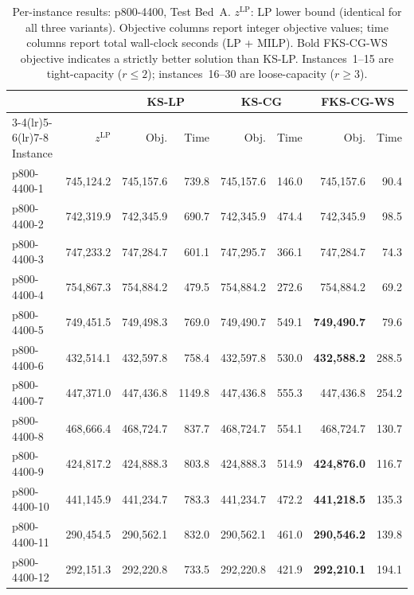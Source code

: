 \begin{table}[htbp]
\centering
\caption{Per-instance results: p800-4400, Test Bed~A.
         $z^{\mathrm{LP}}$: LP lower bound (identical for all three variants).
         Objective columns report integer objective values;
         time columns report total wall-clock seconds (LP + MILP).
         Bold FKS-CG-WS objective indicates a strictly better solution than KS-LP.
         Instances~1--15 are tight-capacity ($r \leq 2$);
         instances~16--30 are loose-capacity ($r \geq 3$).}
\label{tab:app_tba_800_4400}
\footnotesize
\setlength{\tabcolsep}{3pt}
\begin{tabular}{lrrrrrrr}
\toprule
 & & \multicolumn{2}{c}{KS-LP} & \multicolumn{2}{c}{KS-CG} & \multicolumn{2}{c}{FKS-CG-WS} \\
\cmidrule(lr){3-4}\cmidrule(lr){5-6}\cmidrule(lr){7-8}
Instance & $z^{\mathrm{LP}}$ & Obj. & Time & Obj. & Time & Obj. & Time \\
\midrule
p800-4400-1  & 745{,}124.2 & 745{,}157.6 &   739.8 & 745{,}157.6 &   146.0 & 745{,}157.6 &    90.4 \\
p800-4400-2  & 742{,}319.9 & 742{,}345.9 &   690.7 & 742{,}345.9 &   474.4 & 742{,}345.9 &    98.5 \\
p800-4400-3  & 747{,}233.2 & 747{,}284.7 &   601.1 & 747{,}295.7 &   366.1 & 747{,}284.7 &    74.3 \\
p800-4400-4  & 754{,}867.3 & 754{,}884.2 &   479.5 & 754{,}884.2 &   272.6 & 754{,}884.2 &    69.2 \\
p800-4400-5  & 749{,}451.5 & 749{,}498.3 &   769.0 & 749{,}490.7 &   549.1 & \textbf{749{,}490.7} &    79.6 \\
p800-4400-6  & 432{,}514.1 & 432{,}597.8 &   758.4 & 432{,}597.8 &   530.0 & \textbf{432{,}588.2} &   288.5 \\
p800-4400-7  & 447{,}371.0 & 447{,}436.8 & 1149.8 & 447{,}436.8 &   555.3 & 447{,}436.8 &   254.2 \\
p800-4400-8  & 468{,}666.4 & 468{,}724.7 &   837.7 & 468{,}724.7 &   554.1 & 468{,}724.7 &   130.7 \\
p800-4400-9  & 424{,}817.2 & 424{,}888.3 &   803.8 & 424{,}888.3 &   514.9 & \textbf{424{,}876.0} &   116.7 \\
p800-4400-10 & 441{,}145.9 & 441{,}234.7 &   783.3 & 441{,}234.7 &   472.2 & \textbf{441{,}218.5} &   135.3 \\
p800-4400-11 & 290{,}454.5 & 290{,}562.1 &   832.0 & 290{,}562.1 &   461.0 & \textbf{290{,}546.2} &   139.8 \\
p800-4400-12 & 292{,}151.3 & 292{,}220.8 &   733.5 & 292{,}220.8 &   421.9 & \textbf{292{,}210.1} &   194.1 \\

\end{tabular}
\end{table}
